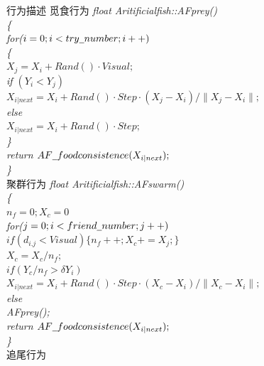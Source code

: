 \documentclass[UTF8]{ctexart}
\begin{document}
\begin{section}
	\begin{subsection}
		{行为描述}
		\small{觅食行为}
			\flushleft\scriptsize{\emph{float Aritificial\underline{\hspace{0.5em}}fish::AF\underline{\hspace{0.5em}}prey()\\{\{}\\{\qquad for($i=0;i<try\underline{\hspace{0.5em}}number;i++)$}\\{\qquad\{}\\{\qquad\qquad$X_j=X_i+Rand()·Visual;$}\\{\qquad\qquad if $(Y_i<Y_j)$}\\{\qquad\qquad\qquad $X_{i|next}=X_i+Rand()·Step·(X_j-X_i)/\lVert X_j-X_i\rVert;$}\\{\qquad\qquad else}\\{\qquad\qquad\qquad $X_{i|next}=X_i+Rand()·Step;$}\\{\qquad\}}\\{ return $AF\underline{\hspace{0.5em}}foodconsistence(X_{i|next});$} \\{\}} }}\\
		\small{聚群行为}
			\flushleft\scriptsize{\emph{float Aritificial\underline{\hspace{0.5em}}fish::AF\underline{\hspace{0.5em}}swarm() \\ {\{} \\ {\qquad $n_f=0;X_c=0$} \\ {\qquad for($j=0;i<friend\underline{\hspace{0.5em}}number;j++)$} \\ {\qquad\qquad $if(d_{i.j}<Visual) \{ n_f++;X_c+=X_j;\}$} \\ {\qquad $X_c=X_c/n_f;$}\\{\qquad $if (Y_c/n_f>\delta Y_i)$}\\{\qquad\qquad $X_{i|next}=X_i+Rand()·Step·(X_c-X_i)/\lVert X_c-X_i\rVert;$}\\{\qquad else}\\{\qquad\qquad AF\underline{\hspace{0.5em}}prey();}\\{ return $AF\underline{\hspace{0.5em}}foodconsistence(X_{i|next});$} \\{\}} }}\\
		\small{追尾行为}

\end{subsection}
\end{section}
\end{document}
